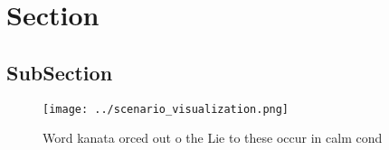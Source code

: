 \documentclass[a4paper]{article}
\begin{document}
\section{Section}

\subsection{SubSection}

\begin{figure}
\centering
\texttt{[image: ../scenario\_visualization.png]}
\caption{Word kanata orced out o the Lie to these occur in calm cond
}
\end{figure}
 
\end{document}
